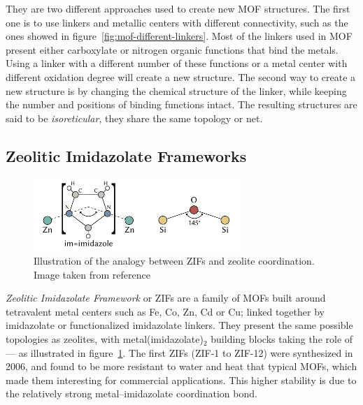 \documentclass[thesis]{subfiles}
\begin{document}
They are two different approaches used to create new MOF structures. The first
one is to use linkers and metallic centers with different connectivity, such as
the ones showed in figure~\ref{fig:mof-different-linkers}. Most of the linkers
used in MOF present either carboxylate or nitrogen organic functions that bind
the metals. Using a linker with a different number of these functions or a metal
center with different oxidation degree will create a new structure. The second
way to create a new structure is by changing the chemical structure of the
linker, while keeping the number and positions of binding functions intact. The
resulting structures are said to be \emph{isoreticular}, \ie they share the same
topology or net.


\subsection{Zeolitic Imidazolate Frameworks}

\begin{figure}[ht]
    \centering
    \includegraphics[width=0.7\textwidth]{figures/images/zeolite-to-zif}
    \caption{Illustration of the analogy between ZIFs and zeolite coordination.
    Image taken from reference~\cite{Bennett2010}}
    \label{fig:zeolite-to-zif}
\end{figure}

\emph{Zeolitic Imidazolate Framework} or ZIFs are a family of MOFs built around
tetravalent  metal centers such as Fe, Co, Zn, Cd or Cu; linked
together by imidazolate or functionalized imidazolate linkers. They present the
same possible topologies as zeolites, with metal(imidazolate)$_2$ building
blocks taking the role of  --- as illustrated in
figure~\ref{fig:zeolite-to-zif}. The first ZIFs (ZIF-1 to ZIF-12) were
synthesized in 2006\cite{Park2006}, and found to be more resistant to water and
heat that typical MOFs, which made them interesting for commercial applications.
This higher stability is due to the relatively strong metal--imidazolate
coordination bond.
\end{document}
